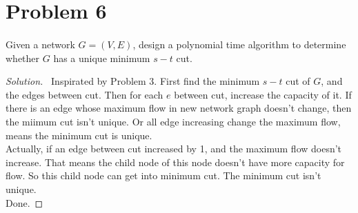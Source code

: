 \documentclass[a4paper]{article}
\newenvironment{solution}
  {\renewcommand\qedsymbol{$\blacksquare$}\begin{proof}[Solution]}
  {\end{proof}}
\begin{document}
\section*{Problem 6}
\paragraph{}
Given a network $G = (V, E)$, design a polynomial time algorithm to determine whether $G$ has a unique
minimum $s-t$ cut.

\begin{solution}\ Inspirated by Problem 3.
   First find the minimum $s-t$ cut of $G$, and the edges between cut. Then for each $e$ between cut, increase the capacity of it. If there is an edge whose maximum flow in new network graph doesn't change, then the miimum cut isn't unique. Or all edge increasing change the maximum flow, means the minimum cut is unique. \\
   Actually, if an edge between cut increased by 1, and the maximum flow doesn't increase. That means the child node of this node doesn't have more capacity for flow. So this child node can get into minimum cut. The minimum cut isn't unique.\\
  Done.
\end{solution}
\end{document}
